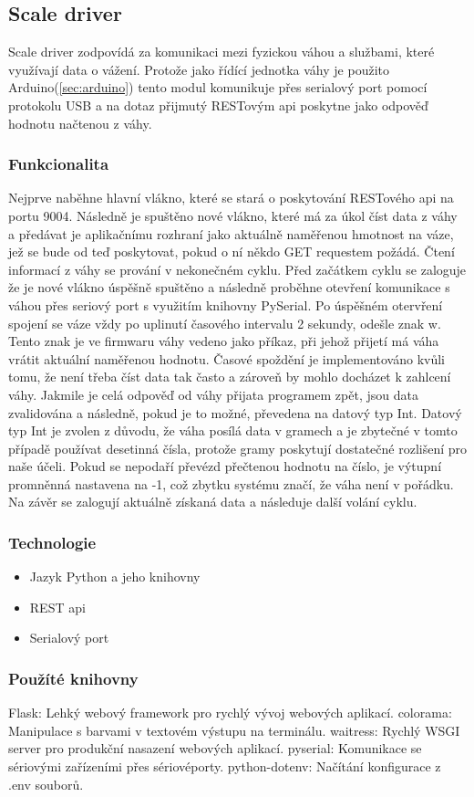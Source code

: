 

\subsection{Scale driver}\label{subsec:scale-driver}
Scale driver zodpovídá za komunikaci mezi fyzickou váhou a službami, které využívají data o vážení.\newline
Protože jako řídící jednotka váhy je použito Arduino(\ref{sec:arduino}) tento modul komunikuje přes serialový port pomocí protokolu USB a na dotaz přijmutý RESTovým api poskytne jako odpověď hodnotu načtenou z váhy.

\subsubsection{Funkcionalita}
Nejprve naběhne hlavní vlákno, které se stará o poskytování RESTového api na portu 9004.
Následně je spuštěno nové vlákno, které má za úkol číst data z váhy a předávat je aplikačnímu rozhraní jako aktuálně naměřenou hmotnost na váze, jež se bude od teď poskytovat, pokud o ní někdo GET requestem požádá.
Čtení informací z váhy se prování v nekonečném cyklu.
Před začátkem cyklu se zaloguje že je nové vlákno úspěšně spuštěno a následně proběhne otevření komunikace s váhou přes seriový port s využitím knihovny PySerial.
Po úspěšném otervření spojení se váze vždy po uplinutí časového intervalu 2 sekundy, odešle znak w.
Tento znak je ve firmwaru váhy vedeno jako příkaz, při jehož přijetí má váha vrátit aktuální naměřenou hodnotu.
Časové spoždění je implementováno kvůli tomu, že není třeba číst data tak často a zároveň by mohlo docházet k zahlcení váhy.
Jakmile je celá odpověď od váhy přijata programem zpět, jsou data zvalidována a následně, pokud je to možné, převedena na datový typ Int.
Datový typ Int je zvolen z důvodu, že váha posílá data v gramech a je zbytečné v tomto případě používat desetinná čísla, protože gramy poskytují dostatečné rozlišení pro naše účeli.
Pokud se nepodaří převézd přečtenou hodnotu na číslo, je výtupní promněnná nastavena na -1, což zbytku systému značí, že váha není v pořádku.
Na závěr se zalogují aktuálně získaná data a následuje další volání cyklu.

\subsubsection{Technologie}
\begin{itemize}
    \item Jazyk Python a jeho knihovny
    \item REST api
    \item Serialový port
\end{itemize}

\subsubsection{Použíté knihovny}
Flask: Lehký webový framework pro rychlý vývoj webových aplikací.
colorama: Manipulace s barvami v textovém výstupu na terminálu.
waitress: Rychlý WSGI server pro produkční nasazení webových aplikací.
pyserial: Komunikace se sériovými zařízeními přes sériovéporty.
python-dotenv: Načítání konfigurace z .env souborů.